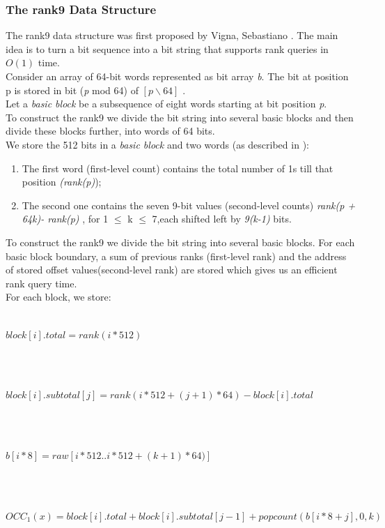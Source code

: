 \documentclass[11pt,a4paper]{report}
\begin{document}
\subsubsection{The rank9 Data Structure} \label{The rank9 Data Structure}


The rank9 data structure was first proposed by Vigna, Sebastiano \cite{rank9}.
The main idea is to turn a bit sequence into a bit string that supports
rank queries in $O(1)$ time.\\

Consider an array of 64-bit words represented as bit array \emph{b}.
The bit at position p is stored in bit (\emph{p} mod 64) of
$ [p \backslash 64]$ \cite{rank9}.\\ 
Let a \emph{basic block} be a subsequence of eight words 
starting at bit position \emph{p}.\\
To construct the rank9  we divide the bit string into several basic
blocks and then divide these blocks further, into words of 64 bits.\\
We store the 512 bits in a \emph{basic block} and two words (as described in \cite{rank9}):

\begin{enumerate}

	\item The first word (first-level count) contains the total number of
	 1s till that position \emph{(rank(p)});
	
	\item The second one contains the seven 9-bit values (second-level counts)
	 \emph{rank(p + 64k)- rank(p)} , for 1 $\leq$ k $\leq$ 7,each shifted left by \emph{9(k-1)} bits.
	
\end{enumerate}

To construct the rank9  we divide the bit string into several basic blocks.
For each basic block boundary, a sum of previous ranks (first-level rank) and the address of  
stored offset values(second-level rank) are stored which gives us an efficient rank query time. \\

For each block, we store:\\\\
\centerline{$ block[i].total= rank(i*512)$}\\\\
\centerline{$ block[i].subtotal[j]= rank(i*512 + (j+1)*64)-block[i].total$}\\\\
\centerline{$ b[i*8]=raw[i*512..i*512+(k+1)*64)] $}\\\\
\centerline{$ OCC_{1}(x)=block[i].total+block[i].subtotal[j-1]+popcount(b[i*8 + j],0,k)$}
\end{document}
